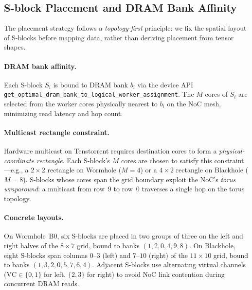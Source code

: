 \documentclass[sigconf, review, anonymous]{acmart}
\newcommand{\SblockName}{S-block}
\newcommand{\SblockNames}{S-blocks}
\newcommand{\topologyFirst}{topology-first}
\begin{document}

\subsection{\SblockName{} Placement and DRAM Bank Affinity}\label{sec:design-placement}

The placement strategy follows a \emph{\topologyFirst} principle:
we fix the spatial layout of \SblockNames{} before mapping data, rather
than deriving placement from tensor shapes.

\paragraph{DRAM bank affinity.}
Each \SblockName{} $S_i$ is bound to DRAM bank $b_i$ via the device API
\texttt{get\_optimal\_dram\_bank\_to\_logical\_worker\_assignment}.
The $M$ cores of $S_i$ are selected from the worker cores physically
nearest to $b_i$ on the NoC mesh, minimizing read latency and
hop count.

\paragraph{Multicast rectangle constraint.}
Hardware multicast on Tenstorrent requires destination cores to form
a \emph{physical-coordinate rectangle}.  Each \SblockName{}'s $M$ cores are
chosen to satisfy this constraint---e.g., a $2{\times}2$ rectangle on
Wormhole ($M{=}4$) or a $4{\times}2$ rectangle on Blackhole
($M{=}8$).  \SblockNames{} whose cores span the grid boundary exploit the
NoC's \emph{torus wraparound}: a multicast from row~9 to row~0
traverses a single hop on the torus topology.

\paragraph{Concrete layouts.}
On Wormhole~B0, six \SblockNames{} are placed in two groups of three on
the left and right halves of the $8{\times}7$ grid, bound to banks
$(1,2,0,4,9,8)$.
On Blackhole, eight \SblockNames{} span columns $0$--$3$ (left) and
$7$--$10$ (right) of the $11{\times}10$ grid, bound to banks
$(1,3,2,0,5,7,6,4)$.
Adjacent \SblockNames{} use alternating virtual channels
($\mathrm{VC} \in \{0,1\}$ for left, $\{2,3\}$ for right) to avoid
NoC link contention during concurrent DRAM reads.


\end{document}
